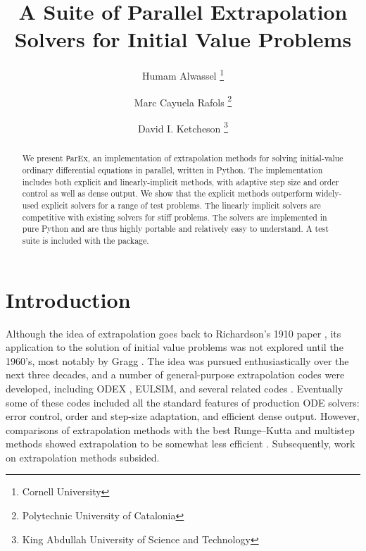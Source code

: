 \documentclass[12pt]{article}
\newcommand{\parex}{\texttt ParEx}
\begin{document}
\title{A Suite of Parallel Extrapolation Solvers for Initial Value Problems}
\author{Humam Alwassel
\thanks{Cornell University} \and
Marc Cayuela Rafols
\thanks{Polytechnic University of Catalonia} \and
David I. Ketcheson
\thanks{King Abdullah University of Science and Technology}
}

\maketitle

\begin{abstract}
We present \parex, an implementation of extrapolation 
methods for solving initial-value ordinary differential equations
in parallel, written in Python.
The implementation includes both explicit and  linearly-implicit methods, with
adaptive step size and order control as well as dense output.
We show that the 
explicit methods outperform widely-used explicit solvers for a 
range of test problems.
The linearly implicit solvers are competitive with existing solvers
for stiff problems.%
The solvers are
implemented in pure Python and are thus highly portable and 
relatively easy to understand.
A test suite is included with the package.
\end{abstract}




\section{Introduction}
Although the idea of extrapolation goes back to Richardson's
1910 paper \cite{richardson1910approximate},
its application to the solution of initial value problems
was not explored until the 1960's, most notably by Gragg \cite{gragg1965extrapolation}.
The idea was pursued enthusiastically over the next three
decades, and a number of general-purpose extrapolation codes
were developed, including ODEX \cite{HairerODEX}, EULSIM, and several related codes \cite{extrapolation_codes}.  
Eventually some of these codes included 
all the standard features of production ODE solvers:
error control, order and step-size adaptation, and 
efficient dense output.
However, comparisons of extrapolation methods with
the best Runge--Kutta and multistep methods showed 
extrapolation to be somewhat less efficient \cite{Shampine1986,hosea1994a}.
Subsequently, work on extrapolation methods subsided.
\end{document}
